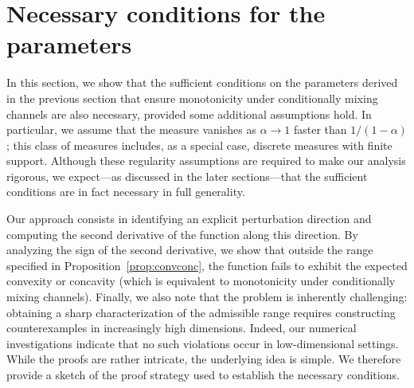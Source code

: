 \documentclass[aps,pra,11pt,onecolumn,nofootinbib,tightenlines]{revtex4-2}
\theoremstyle{definition}
\begin{document}
\section{Necessary conditions for the parameters}
\label{sec: necessary conditions measures}
In this section, we show that the sufficient conditions on the parameters derived in the previous section that ensure monotonicity under conditionally mixing channels are also necessary, provided some additional assumptions hold. In particular, we assume that the measure vanishes as $\alpha \to 1$ faster than $1/(1-\alpha)$; this class of measures includes, as a special case, discrete measures with finite support. Although these regularity assumptions are required to make our analysis rigorous, we expect---as discussed in the later sections---that the sufficient conditions are in fact necessary in full generality.


Our approach consists in identifying an explicit perturbation direction and computing the second derivative of the function along this direction. By analyzing the sign of the second derivative, we show that outside the range specified in Proposition~\ref{prop:convconc}, the function fails to exhibit the expected convexity or concavity (which is equivalent to monotonicity under conditionally mixing channels). 
Finally, we also note that the problem is inherently challenging: obtaining a sharp characterization of the admissible range requires constructing counterexamples in increasingly high dimensions. Indeed, our numerical investigations indicate that no such violations occur in low-dimensional settings. While the proofs are rather intricate, the underlying idea is simple. We therefore provide a sketch of the proof strategy used to establish the necessary conditions.
\end{document}
